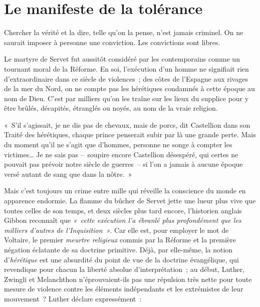 \documentclass[french,twoside]{book} %
\newcommand{\bibl}[1]{{\RaggedLeft{#1}\par\bigskip}}
\newenvironment{quoteblock}%
  {\begin{quoting}}
  {\end{quoting}}
\newcommand\chapteropen{} %
\newcommand\chaptercont{} %
\newenvironment{quotebar}{%
    \def\FrameCommand{{\color{rubric!10!}\vrule width 0.5em} \hspace{0.9em}}%
    \def\OuterFrameSep{2pt} %
    \MakeFramed {\advance\hsize-\width \FrameRestore}
  }%
  {%
    \endMakeFramed
  }
\renewenvironment{quoteblock}%
  {%
    \savenotes
    \setstretch{0.9}
    \normalfont
    \begin{quotebar}
  }
  {%
    \end{quotebar}
    \spewnotes
  }
\begin{document}
\chapteropen
\chapter[{Le manifeste de la tolérance}]{Le manifeste de la tolérance}\renewcommand{\leftmark}{Le manifeste de la tolérance}


\epigraph{\noindent Chercher la vérité et la dire, telle qu’on la pense, n’est jamais criminel. On ne saurait imposer à personne une conviction. Les convictions sont libres.\par
}{
\bibl{Sébastien Castellion}
}


\chaptercont
\noindent Le martyre de Servet fut aussitôt considéré par les contemporains comme un tournant moral de la Réforme. En soi, l’exécution d’un homme ne signifiait rien d’extraordinaire dans ce siècle de violences ; des côtes de l’Espagne aux rivages de la mer du Nord, on ne compte pas les hérétiques condamnés à cette époque au nom de Dieu. C’est par milliers qu’on les traîne sur les lieux du supplice pour y être brûlés, décapités, étranglés ou noyés, au nom de la vraie religion.\par

\begin{quoteblock}
\noindent « S’il s’agissait, je ne dis pas de chevaux, mais de porcs, dit Castellion dans son Traité des hérétiques, chaque prince penserait subir par là une grande perte. Mais du moment qu’il ne s’agit que d’hommes, personne ne songe à compter les victimes… Je ne sais pas – soupire encore Castellion désespéré, qui certes ne pouvait pas prévoir notre siècle de guerres – si l’on a jamais à aucune époque versé autant de sang que dans la nôtre. »\end{quoteblock}

\noindent Mais c’est toujours un crime entre mille qui réveille la conscience du monde en apparence endormie. La flamme du bûcher de Servet jette une lueur plus vive que toutes celles de son temps, et deux siècles plus tard encore, l’historien anglais Gibbon reconnaît que \emph{« cette exécution l’a ébranlé plus profondément que les milliers d’autres de l’Inquisition »}. Car elle est, pour employer le mot de Voltaire, le premier \emph{meurtre religieux} commis par la Réforme et la première négation éclatante de sa doctrine primitive. Déjà, par elle-même, la notion d’\emph{hérétique} est une absurdité du point de vue de la doctrine évangélique, qui revendique pour chacun la liberté absolue d’interprétation ; au début, Luther, Zwingli et Melanchthon n’éprouvaient-ils pas une répulsion très nette pour toute mesure de violence contre les éléments indépendants et les extrémistes de leur mouvement ? Luther déclare expressément :\par
\end{document}
